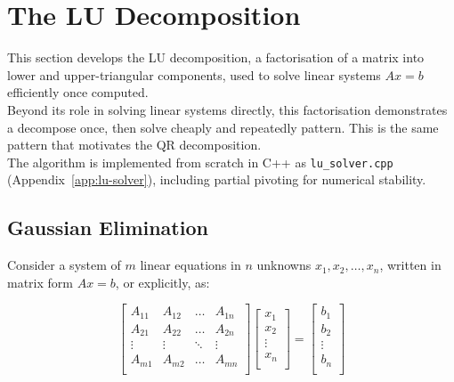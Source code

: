 \section{The LU Decomposition}
\label{sec:lu-decomposition}
	
	This section develops the LU decomposition, a factorisation of a matrix into lower and upper-triangular components, used to solve linear systems $Ax = b$ efficiently once computed. \\
	
	Beyond its role in solving linear systems directly, this factorisation demonstrates a decompose once, then solve cheaply and repeatedly pattern. This is the same pattern that motivates the QR decomposition. \\
	
	The algorithm is implemented from scratch in C++ as \texttt{lu\_solver.cpp} (Appendix~\ref{app:lu-solver}), including partial pivoting for numerical stability.
	
	\subsection{Gaussian Elimination}
		
		\indent \indent Consider a system of $m$ linear equations in $n$ unknowns $x_1, x_2, \dots, x_n$, written in matrix form $Ax = b$, or explicitly, as:
	
		\begin{equation*}
			\begin{bmatrix}
				A_{11} & A_{12} & \dots & A_{1n} \\
				A_{21} & A_{22} & \dots & A_{2n} \\
				\vdots & \vdots & \ddots & \vdots \\
				A_{m1} & A_{m2} & \dots & A_{mn} \\
			\end{bmatrix}
			\begin{bmatrix}
				x_1 \\
				x_2 \\
				\vdots \\
				x_n \\
			\end{bmatrix}
			=
			\begin{bmatrix}
				b_1 \\
				b_2 \\
				\vdots \\
				b_n \\
			\end{bmatrix}
		\end{equation*}
		
